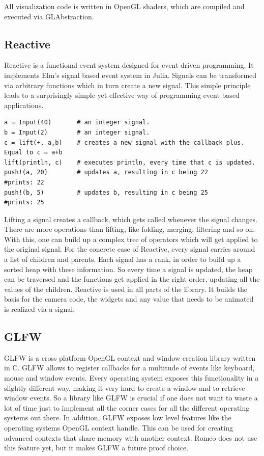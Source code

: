 All visualization code is written in OpenGL shaders, which are compiled and executed via GLAbstraction.

\subsection{Reactive}\label{reactive}
Reactive\cite{Reactive} is a functional event system designed for event driven programming.
It implements Elm's\cite{Elm} signal based event system in Julia.
Signals can be transformed via arbitrary functions which in turn create a new signal.
This simple principle leads to a surprisingly simple yet effective way of programming event based applications.

\begin{lstlisting}
a = Input(40)       # an integer signal.
b = Input(2)        # an integer signal.
c = lift(+, a,b)    # creates a new signal with the callback plus. Equal to c = a+b
lift(println, c)    # executes println, every time that c is updated. 
push!(a, 20)        # updates a, resulting in c being 22
#prints: 22
push!(b, 5)         # updates b, resulting in c being 25
#prints: 25
\end{lstlisting}

Lifting a signal creates a callback, which gets called whenever the signal changes.
There are more operations than lifting, like folding, merging, filtering and so on.
With this, one can build up a complex tree of operators which will get applied to the original signal.
For the concrete case of Reactive, every signal carries around a list of children and parents.
Each signal has a rank, in order to build up a sorted heap with these information.
So every time a signal is updated, the heap can be traversed and the functions get applied in the right order, updating all the values of the children.
Reactive is used in all parts of the library. It builds the basis for the camera code, the widgets and any value that needs to be animated is realized via a signal.

\subsection{GLFW}
GLFW\cite{GLFW} is a cross platform \ac{OpenGL} context and window creation library written in C.
GLFW allows to register callbacks for a multitude of events like keyboard, mouse and window events.
Every operating system exposes this functionality in a slightly different way, making it very hard to create a window and to retrieve window events.
So a library like GLFW is crucial if one does not want to waste a lot of time just to implement all the corner cases for all the different operating systems out there.
In addition, GLFW exposes low level features like the operating systems \ac{OpenGL} context handle.
This can be used for creating advanced contexts that share memory with another context.
Romeo does not use this feature yet, but it makes GLFW a future proof choice.


